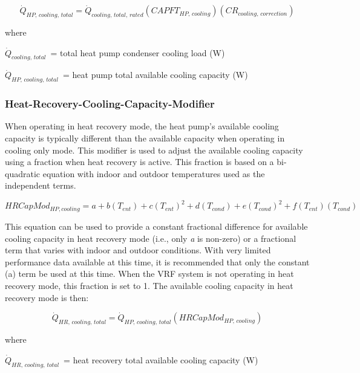 \begin{equation}
  \dot{Q}_{HP,\,cooling,\,total} = \dot{Q}_{cooling,\,total,\,rated} \left( CAPFT_{HP,\,cooling} \right) \left( CR_{cooling,\,correction} \right)
\end{equation}

where

\(\dot{Q}_{cooling,\,total}\) = total heat pump condenser cooling load (W)

\(\dot{Q}_{HP,\,cooling,\,total}\) = heat pump total available cooling capacity (W)

\subsubsection{Heat-Recovery-Cooling-Capacity-Modifier}\label{heat-recovery-cooling-capacity-modifier}

When operating in heat recovery mode, the heat pump's available cooling capacity is typically different than the available capacity when operating in cooling only mode. This modifier is used to adjust the available cooling capacity using a fraction when heat recovery is active. This fraction is based on a bi-quadratic equation with indoor and outdoor temperatures used as the independent terms.

\begin{equation}
  HRCapMod_{HP,cooling} = a + b \left( T_{ent} \right) + c \left( T_{ent} \right)^2 + d \left( T_{cond} \right) + e \left( T_{cond} \right)^2 + f \left( T_{ent} \right) \left( T_{cond} \right)
\end{equation}

This equation can be used to provide a constant fractional difference for available cooling capacity in heat recovery mode (i.e., only \emph{a} is non-zero) or a fractional term that varies with indoor and outdoor conditions. With very limited performance data available at this time, it is recommended that only the constant (a) term be used at this time. When the VRF system is not operating in heat recovery mode, this fraction is set to 1. The available cooling capacity in heat recovery mode is then:

\begin{equation}
  \dot{Q}_{HR,\,cooling,\,total} = \dot{Q}_{HP,\,cooling,\,total} \left( HRCapMod_{HP,\,cooling} \right)
\end{equation}

where

\(\dot{Q}_{HR,\,cooling,\,total}\) = heat recovery total available cooling capacity (W)

